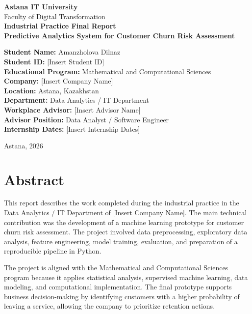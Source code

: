\documentclass[12pt,a4paper]{article}
\newcommand{\studentName}{Amanzholova Dilnaz}
\newcommand{\studentID}{[Insert Student ID]}
\newcommand{\programName}{Mathematical and Computational Sciences}
\newcommand{\companyName}{[Insert Company Name]}
\newcommand{\companyLocation}{Astana, Kazakhstan}
\newcommand{\departmentName}{Data Analytics / IT Department}
\newcommand{\advisorName}{[Insert Advisor Name]}
\newcommand{\advisorRole}{Data Analyst / Software Engineer}
\newcommand{\internshipDates}{[Insert Internship Dates]}
\newcommand{\projectTitle}{Predictive Analytics System for Customer Churn Risk Assessment}
\begin{document}
\begin{titlepage}
    \centering
    \vspace*{1cm}
    {\Large \textbf{Astana IT University}}\\[0.5cm]
    {\large Faculty of Digital Transformation}\\[2cm]

    {\LARGE \textbf{Industrial Practice Final Report}}\\[0.7cm]
    {\Large \textbf{\projectTitle}}\\[2cm]

    \begin{flushleft}
    \textbf{Student Name:} \studentName \\
    \textbf{Student ID:} \studentID \\
    \textbf{Educational Program:} \programName \\
    \textbf{Company:} \companyName \\
    \textbf{Location:} \companyLocation \\
    \textbf{Department:} \departmentName \\
    \textbf{Workplace Advisor:} \advisorName \\
    \textbf{Advisor Position:} \advisorRole \\
    \textbf{Internship Dates:} \internshipDates \\
    \end{flushleft}

    \vfill
    {\large Astana, 2026}
\end{titlepage}

\tableofcontents
\newpage

\section*{Abstract}

This report describes the work completed during the industrial practice in the \departmentName{} of \companyName{}. The main technical contribution was the development of a machine learning prototype for customer churn risk assessment. The project involved data preprocessing, exploratory data analysis, feature engineering, model training, evaluation, and preparation of a reproducible pipeline in Python.

The project is aligned with the Mathematical and Computational Sciences program because it applies statistical analysis, supervised machine learning, data modeling, and computational implementation. The final prototype supports business decision-making by identifying customers with a higher probability of leaving a service, allowing the company to prioritize retention actions.
\end{document}
